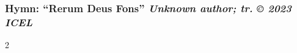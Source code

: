 \subsubsection*{Hymn: ``Rerum Deus Fons'' \hfill
{\small\itshape Unknown author; tr. © 2023 ICEL}}

\begin{multicols*}{2}
        
\end{multicols*}

